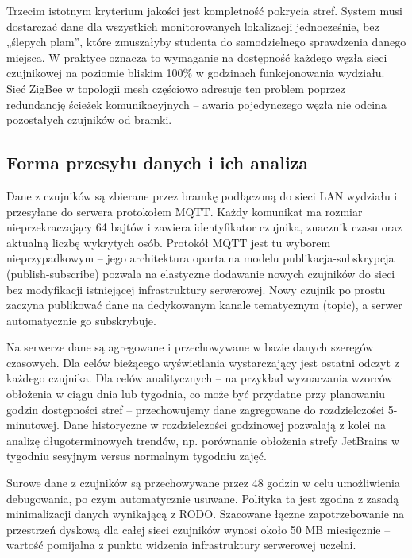 \documentclass[14pt,a4paper]{extarticle}
\begin{document}
Trzecim istotnym kryterium jakości jest kompletność pokrycia stref. System musi dostarczać dane dla wszystkich monitorowanych lokalizacji jednocześnie, bez „ślepych plam”, które zmuszałyby studenta do samodzielnego sprawdzenia danego miejsca. W praktyce oznacza to wymaganie na dostępność każdego węzła sieci czujnikowej na poziomie bliskim 100\% w godzinach funkcjonowania wydziału. Sieć ZigBee w topologii mesh częściowo adresuje ten problem poprzez redundancję ścieżek komunikacyjnych -- awaria pojedynczego węzła nie odcina pozostałych czujników od bramki.

\subsection{Forma przesyłu danych i ich analiza}

Dane z czujników są zbierane przez bramkę podłączoną do sieci LAN wydziału i przesyłane do serwera protokołem MQTT. Każdy komunikat ma rozmiar nieprzekraczający 64 bajtów i zawiera identyfikator czujnika, znacznik czasu oraz aktualną liczbę wykrytych osób. Protokół MQTT jest tu wyborem nieprzypadkowym -- jego architektura oparta na modelu publikacja-subskrypcja (publish-subscribe) pozwala na elastyczne dodawanie nowych czujników do sieci bez modyfikacji istniejącej infrastruktury serwerowej. Nowy czujnik po prostu zaczyna publikować dane na dedykowanym kanale tematycznym (topic), a serwer automatycznie go subskrybuje.

Na serwerze dane są agregowane i przechowywane w bazie danych szeregów czasowych. Dla celów bieżącego wyświetlania wystarczający jest ostatni odczyt z każdego czujnika. Dla celów analitycznych -- na przykład wyznaczania wzorców obłożenia w ciągu dnia lub tygodnia, co może być przydatne przy planowaniu godzin dostępności stref -- przechowujemy dane zagregowane do rozdzielczości 5-minutowej. Dane historyczne w rozdzielczości godzinowej pozwalają z kolei na analizę długoterminowych trendów, np. porównanie obłożenia strefy JetBrains w tygodniu sesyjnym versus normalnym tygodniu zajęć.

Surowe dane z czujników są przechowywane przez 48 godzin w celu umożliwienia debugowania, po czym automatycznie usuwane. Polityka ta jest zgodna z zasadą minimalizacji danych wynikającą z RODO. Szacowane łączne zapotrzebowanie na przestrzeń dyskową dla całej sieci czujników wynosi około 50 MB miesięcznie -- wartość pomijalna z punktu widzenia infrastruktury serwerowej uczelni.
\end{document}
